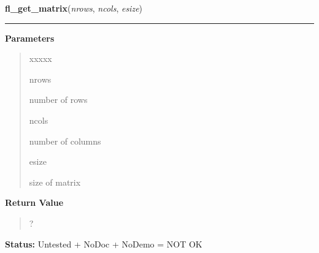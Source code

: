     \label{xformslib:flflimage:fl_get_matrix}

    \vspace{0.5ex}

\hspace{.8\funcindent}\begin{boxedminipage}{\funcwidth}

    \raggedright \textbf{fl\_get\_matrix}(\textit{nrows}, \textit{ncols}, \textit{esize})

    \vspace{-1.5ex}

    \rule{\textwidth}{0.5\fboxrule}
\setlength{\parskip}{2ex}
\setlength{\parskip}{1ex}
      \textbf{Parameters}
      \vspace{-1ex}

      \begin{quote}
        \begin{Ventry}{xxxxx}

          \item[nrows]

          number of rows

          \item[ncols]

          number of columns

          \item[esize]

          size of matrix

        \end{Ventry}

      \end{quote}

      \textbf{Return Value}
    \vspace{-1ex}

      \begin{quote}
      ?

      \end{quote}

\textbf{Status:} Untested + NoDoc + NoDemo = NOT OK



    \end{boxedminipage}

    \label{xformslib:flflimage:fl_make_matrix}

